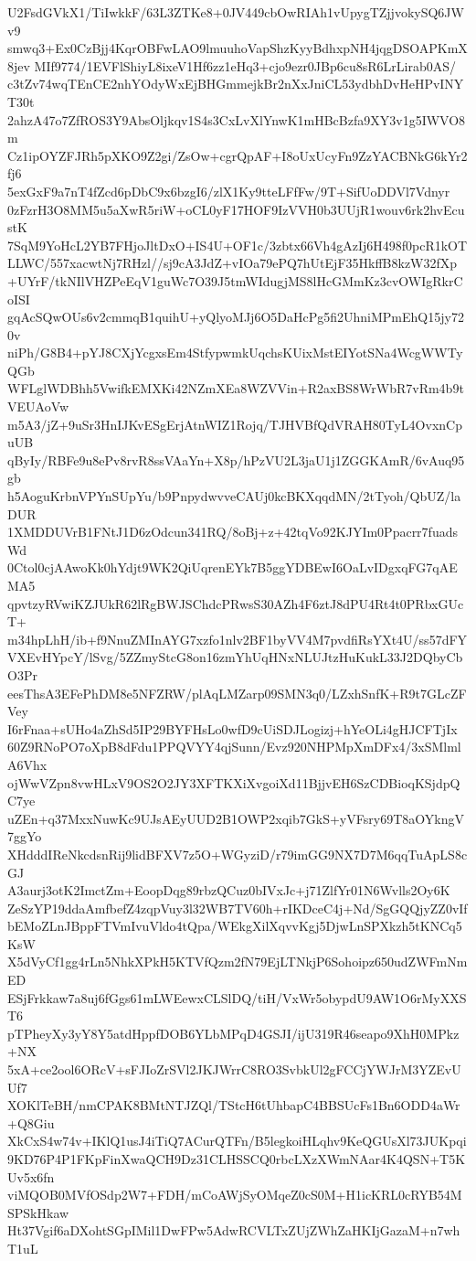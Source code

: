 U2FsdGVkX1/TiIwkkF/63L3ZTKe8+0JV449cbOwRIAh1vUpygTZjjvokySQ6JWv9
smwq3+Ex0CzBjj4KqrOBFwLAO9lmuuhoVapShzKyyBdhxpNH4jqgDSOAPKmX8jev
MIf9774/1EVFlShiyL8ixeV1Hf6zz1eHq3+cjo9ezr0JBp6cu8sR6LrLirab0AS/
c3tZv74wqTEnCE2nhYOdyWxEjBHGmmejkBr2nXxJniCL53ydbhDvHeHPvINYT30t
2ahzA47o7ZfROS3Y9AbsOljkqv1S4s3CxLvXlYnwK1mHBcBzfa9XY3v1g5IWVO8m
Cz1ipOYZFJRh5pXKO9Z2gi/ZsOw+cgrQpAF+I8oUxUcyFn9ZzYACBNkG6kYr2fj6
5exGxF9a7nT4fZcd6pDbC9x6bzgI6/zlX1Ky9tteLFfFw/9T+SifUoDDVl7Vdnyr
0zFzrH3O8MM5u5aXwR5riW+oCL0yF17HOF9IzVVH0b3UUjR1wouv6rk2hvEcustK
7SqM9YoHcL2YB7FHjoJltDxO+IS4U+OF1c/3zbtx66Vh4gAzIj6H498f0pcR1kOT
LLWC/557xacwtNj7RHzl//sj9cA3JdZ+vIOa79ePQ7hUtEjF35HkffB8kzW32fXp
+UYrF/tkNIlVHZPeEqV1guWc7O39J5tmWIdugjMS8lHcGMmKz3cvOWIgRkrCoISI
gqAcSQwOUs6v2cmmqB1quihU+yQlyoMJj6O5DaHcPg5fi2UhniMPmEhQ15jy720v
niPh/G8B4+pYJ8CXjYcgxsEm4StfypwmkUqchsKUixMstEIYotSNa4WcgWWTyQGb
WFLglWDBhh5VwifkEMXKi42NZmXEa8WZVVin+R2axBS8WrWbR7vRm4b9tVEUAoVw
m5A3/jZ+9uSr3HnIJKvESgErjAtnWIZ1Rojq/TJHVBfQdVRAH80TyL4OvxnCpuUB
qByIy/RBFe9u8ePv8rvR8ssVAaYn+X8p/hPzVU2L3jaU1j1ZGGKAmR/6vAuq95gb
h5AoguKrbnVPYnSUpYu/b9PnpydwvveCAUj0kcBKXqqdMN/2tTyoh/QbUZ/laDUR
1XMDDUVrB1FNtJ1D6zOdcun341RQ/8oBj+z+42tqVo92KJYIm0Ppacrr7fuadsWd
0Ctol0cjAAwoKk0hYdjt9WK2QiUqrenEYk7B5ggYDBEwI6OaLvIDgxqFG7qAEMA5
qpvtzyRVwiKZJUkR62lRgBWJSChdcPRwsS30AZh4F6ztJ8dPU4Rt4t0PRbxGUcT+
m34hpLhH/ib+f9NnuZMInAYG7xzfo1nlv2BF1byVV4M7pvdfiRsYXt4U/ss57dFY
VXEvHYpcY/lSvg/5ZZmyStcG8on16zmYhUqHNxNLUJtzHuKukL33J2DQbyCbO3Pr
eesThsA3EFePhDM8e5NFZRW/plAqLMZarp09SMN3q0/LZxhSnfK+R9t7GLcZFVey
I6rFnaa+sUHo4aZhSd5IP29BYFHsLo0wfD9cUiSDJLogizj+hYeOLi4gHJCFTjIx
60Z9RNoPO7oXpB8dFdu1PPQVYY4qjSunn/Evz920NHPMpXmDFx4/3xSMlmlA6Vhx
ojWwVZpn8vwHLxV9OS2O2JY3XFTKXiXvgoiXd11BjjvEH6SzCDBioqKSjdpQC7ye
uZEn+q37MxxNuwKc9UJsAEyUUD2B1OWP2xqib7GkS+yVFsry69T8aOYkngV7ggYo
XHdddIReNkcdsnRij9lidBFXV7z5O+WGyziD/r79imGG9NX7D7M6qqTuApLS8cGJ
A3aurj3otK2ImctZm+EoopDqg89rbzQCuz0bIVxJc+j71ZlfYr01N6Wvlls2Oy6K
ZeSzYP19ddaAmfbefZ4zqpVuy3l32WB7TV60h+rIKDceC4j+Nd/SgGQQjyZZ0vIf
bEMoZLnJBppFTVmIvuVldo4tQpa/WEkgXilXqvvKgj5DjwLnSPXkzh5tKNCq5KsW
X5dVyCf1gg4rLn5NhkXPkH5KTVfQzm2fN79EjLTNkjP6Sohoipz650udZWFmNmED
ESjFrkkaw7a8uj6fGgs61mLWEewxCLSlDQ/tiH/VxWr5obypdU9AW1O6rMyXXST6
pTPheyXy3yY8Y5atdHppfDOB6YLbMPqD4GSJI/ijU319R46seapo9XhH0MPkz+NX
5xA+ce2ool6ORcV+sFJIoZrSVl2JKJWrrC8RO3SvbkUl2gFCCjYWJrM3YZEvUUf7
XOKlTeBH/nmCPAK8BMtNTJZQl/TStcH6tUhbapC4BBSUcFs1Bn6ODD4aWr+Q8Giu
XkCxS4w74v+IKlQ1usJ4iTiQ7ACurQTFn/B5legkoiHLqhv9KeQGUsXl73JUKpqi
9KD76P4P1FKpFinXwaQCH9Dz31CLHSSCQ0rbcLXzXWmNAar4K4QSN+T5KUv5x6fn
viMQOB0MVfOSdp2W7+FDH/mCoAWjSyOMqeZ0cS0M+H1icKRL0cRYB54MSPSkHkaw
Ht37Vgif6aDXohtSGpIMil1DwFPw5AdwRCVLTxZUjZWhZaHKIjGazaM+n7whT1uL
